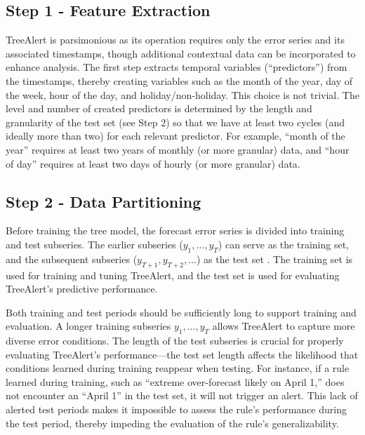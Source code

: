 \documentclass[ijds,sglanonrev]{informs4}
\begin{document}
\subsection{Step 1 - Feature Extraction}

TreeAlert is parsimonious as its operation requires only the error series and its associated timestamps, though additional contextual data can be incorporated to enhance analysis. The first step extracts temporal variables (“predictors”) from the timestamps, thereby creating variables such as the month of the year, day of the week, hour of the day, and holiday/non-holiday. This choice is not trivial. The level and number of created predictors is determined by the length and granularity of the test set (see Step 2) so that we have at least two cycles (and ideally more than two) for each relevant predictor. For example, “month of the year” requires at least two years of monthly (or more granular) data, and “hour of day” requires at least two days of hourly (or more granular) data.

\subsection{Step 2 - Data Partitioning}

Before training the tree model, the forecast error series is divided into training and test subseries. The earlier subseries ($y_1, \ldots, y_T$) can serve as the training set, and the subsequent subseries ($y_{T+1}, y_{T+2}, \ldots$) as the test set \citep{shmueli2024}. The training set is used for training and tuning TreeAlert, and the test set is used for evaluating TreeAlert's predictive performance.

Both training and test periods should be sufficiently long to support training and evaluation. %
A longer training subseries $y_1, \ldots, y_T$ allows TreeAlert to capture more diverse error conditions. %
The length of the test subseries is crucial for properly evaluating TreeAlert's performance---the test set length affects %
the likelihood that conditions learned during training reappear when testing. For instance, if a rule learned during training, such as ``extreme over-forecast likely on April 1,'' does not encounter an ``April 1'' in the test set, it will not trigger an alert. This lack of alerted test periods makes it impossible to assess the rule's performance during the test period, thereby impeding the evaluation of the rule’s generalizability.
\end{document}
